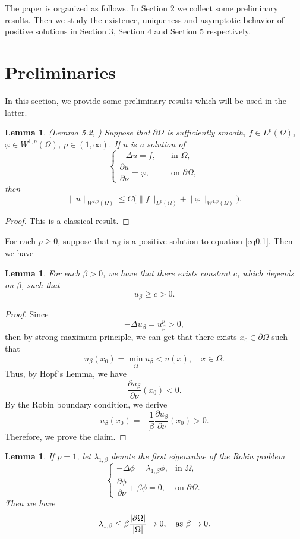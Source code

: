 \documentclass[12pt,reqno]{amsart}
\numberwithin{equation}{section}
\newtheorem{lemma}[theorem]{Lemma}
\theoremstyle{definition}
\begin{document}
The paper is organized as follows. In Section 2 we collect some preliminary results. Then we study the existence, uniqueness and asymptotic behavior of positive solutions in Section 3, Section 4 and Section 5 respectively. 



\section{Preliminaries}
In this section, we provide some preliminary results which will be used in the latter. 


\begin{lemma}\label{lemma2.3}
(Lemma 5.2, \cite{W}) Suppose that $\partial\Omega$ is sufficiently smooth, $f\in L^p(\Omega)$, 
$\varphi\in W^{1,p}(\Omega)$, $p\in(1,\infty)$. 
If $u$ is a solution of 
\[
\begin{cases}
-\Delta u=f,\quad &\text{in }\Omega,\\
\dfrac{\partial u}{\partial \nu}=\varphi, &\text{on }\partial\Omega,
\end{cases}
\]
then 
\[
\|u\|_{W^{2,p}(\Omega)}
\leq C\big(\|f\|_{L^p(\Omega)}+\|\varphi\|_{W^{1,p}(\Omega)}\big).
\]
\end{lemma}

\begin{proof}
This is a classical result.
\end{proof}


For each $p\geq 0$, suppose that $u_\beta$ is a positive solution to equation \eqref{eq0.1}. Then we have 

\begin{lemma}\label{Lemma2.1}
For each $\beta>0$,  we have that there exists constant $c$, which depends on $\beta$,  such that 
$$
u_\beta\ge c>0.
$$
\end{lemma}


\begin{proof}
Since 
$$
-\Delta u_\beta=u_\beta^p> 0,
$$
then by strong maximum principle, we can get that there exists $x_0\in\partial\Omega$ such that 
$$
u_\beta(x_0)=\min_{\bar{\Omega}}u_\beta<u(x),\quad x\in \Omega.
$$
Thus, by Hopf's Lemma, we have 
$$
\frac{\partial u_\beta}{\partial \nu}(x_0)<0.
$$
By the Robin boundary condition, we derive 
$$
u_\beta(x_0)=-\frac{1}{\beta}\frac{\partial u_\beta}{\partial \nu}(x_0)>0.
$$
Therefore, we prove the claim. 
\end{proof}


\begin{lemma}\label{lemma2.2}
If $p=1$, let $\lambda_{1,\beta}$ denote the first eigenvalue of the Robin problem
\[
\begin{cases}
-\Delta \phi=\lambda_{1,\beta}\phi, &\text{in }\Omega,\\
\dfrac{\partial \phi}{\partial \nu}+\beta \phi=0, &\text{on }\partial\Omega.
\end{cases}
\]
Then we have
\begin{equation}\label{2.7}
\lambda_{1,\beta}\le\beta\frac{|\partial\Omega|}{|\Omega|}\to0,\quad\hbox{as }\beta\to0.
\end{equation}
\end{lemma}
\end{document}
